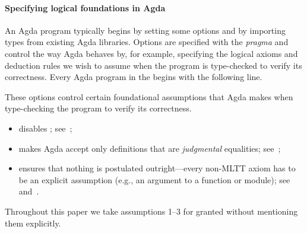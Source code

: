 \paragraph*{Specifying logical foundations in Agda}
An Agda program typically begins by setting some options and by importing types from existing Agda libraries.
Options are specified with the  \emph{pragma} and control the way Agda behaves by, for example, specifying the logical axioms and deduction rules we wish to assume when the program is type-checked to verify its correctness. Every Agda program in the \ualib begins with the following line.
\ccpad
\begin{code}[number=code:options]
\>[0]\AgdaSymbol{\{-\#}\AgdaSpace{}%
\AgdaSpace{}%
\AgdaSpace{}%
\AgdaSpace{}%
\AgdaSpace{}%
\AgdaSymbol{\#-\}}\<%
\end{code}
\ccpad
These options control certain foundational assumptions that Agda makes when type-checking the program to verify its correctness.
\begin{itemize}
\item {} disables \axiomk; see~\cite{agdaref-axiomk};
\item {} makes Agda accept only definitions that are \emph{judgmental} equalities; see~\cite{agdatools-patternmatching};
\item {} ensures that nothing is postulated outright---every non-MLTT axiom has to be an explicit assumption (e.g., an argument to a function or module); see~\cite{agdaref-safeagda} and~\cite{agdatools-patternmatching}.
\end{itemize}
Throughout this paper we take assumptions 1--3 for granted without mentioning them explicitly.


